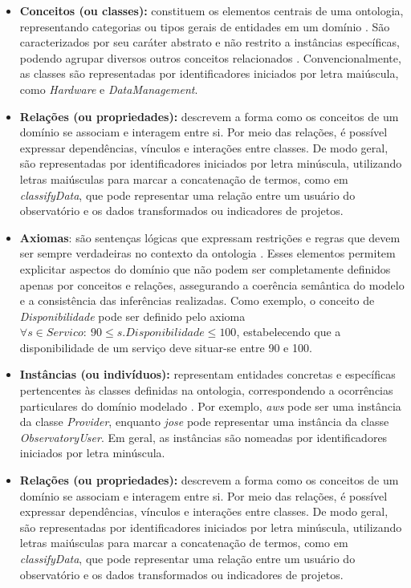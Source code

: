 \begin{itemize}
    \item \textbf{Conceitos (ou classes):} constituem os elementos centrais de uma ontologia, representando categorias ou tipos gerais de entidades em um domínio \cite{isotani2015ontologias}. São caracterizados por seu caráter abstrato e não restrito a instâncias específicas, podendo agrupar diversos outros conceitos relacionados \cite{corcho2005building}. Convencionalmente, as classes são representadas por identificadores iniciados por letra maiúscula, como \textit{Hardware} e \textit{DataManagement}.
    \item \textbf{Relações (ou propriedades):} descrevem a forma como os conceitos de um domínio se associam e interagem entre si. Por meio das relações, é possível expressar dependências, vínculos e interações entre classes. De modo geral, são representadas por identificadores iniciados por letra minúscula, utilizando letras maiúsculas para marcar a concatenação de termos, como em \textit{classifyData}, que pode representar uma relação entre um usuário do observatório e os dados transformados ou indicadores de projetos.
    \item \textbf{Axiomas}: são sentenças lógicas que expressam restrições e regras que devem ser sempre verdadeiras no contexto da ontologia \cite{corcho2005building}. Esses elementos permitem explicitar aspectos do domínio que não podem ser completamente definidos apenas por conceitos e relações, assegurando a coerência semântica do modelo e a consistência das inferências realizadas. Como exemplo, o conceito de \textit{Disponibilidade} pode ser definido pelo axioma $\forall s \in Servico:\ 90 \leq s.Disponibilidade \leq 100$, estabelecendo que a disponibilidade de um serviço deve situar-se entre 90 e 100.
    \item \textbf{Instâncias (ou indivíduos):} representam entidades concretas e específicas pertencentes às classes definidas na ontologia, correspondendo a ocorrências particulares do domínio modelado \cite{corcho2005building}. Por exemplo, \textit{aws} pode ser uma instância da classe \textit{Provider}, enquanto \textit{jose} pode representar uma instância da classe \textit{ObservatoryUser}. Em geral, as instâncias são nomeadas por identificadores iniciados por letra minúscula.
    \item \textbf{Relações (ou propriedades):} descrevem a forma como os conceitos de um domínio se associam e interagem entre si. Por meio das relações, é possível expressar dependências, vínculos e interações entre classes. De modo geral, são representadas por identificadores iniciados por letra minúscula, utilizando letras maiúsculas para marcar a concatenação de termos, como em \textit{classifyData}, que pode representar uma relação entre um usuário do observatório e os dados transformados ou indicadores de projetos.

\end{itemize}

